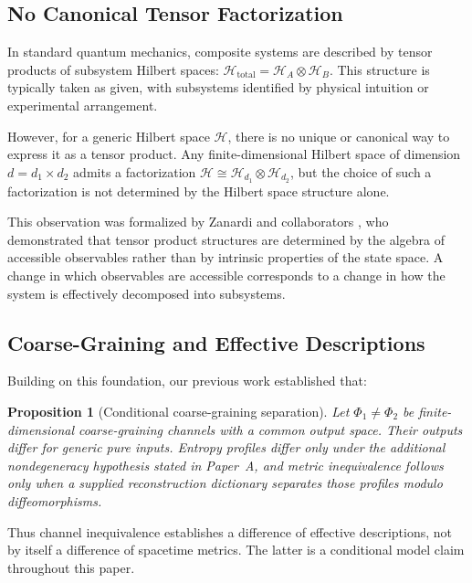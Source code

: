 \documentclass[12pt,a4paper]{article}
\newtheorem{proposition}[theorem]{Proposition}
\begin{document}
\subsection{No Canonical Tensor Factorization}

In standard quantum mechanics, composite systems are described by tensor products of subsystem Hilbert spaces: $\mathcal{H}_{\text{total}} = \mathcal{H}_A \otimes \mathcal{H}_B$. This structure is typically taken as given, with subsystems identified by physical intuition or experimental arrangement.

However, for a generic Hilbert space $\mathcal{H}$, there is no unique or canonical way to express it as a tensor product. Any finite-dimensional Hilbert space of dimension $d = d_1 \times d_2$ admits a factorization $\mathcal{H} \cong \mathcal{H}_{d_1} \otimes \mathcal{H}_{d_2}$, but the choice of such a factorization is not determined by the Hilbert space structure alone.

This observation was formalized by Zanardi and collaborators \cite{Zanardi2001,Zanardi2004}, who demonstrated that tensor product structures are determined by the algebra of accessible observables rather than by intrinsic properties of the state space. A change in which observables are accessible corresponds to a change in how the system is effectively decomposed into subsystems.

\subsection{Coarse-Graining and Effective Descriptions}

Building on this foundation, our previous work \cite{Liu2026PaperA} established that:

\begin{proposition}[Conditional coarse-graining separation]
\label{prop:inequiv}
Let $\Phi_1\ne\Phi_2$ be finite-dimensional coarse-graining channels with a common output space.  Their outputs differ for generic pure inputs.  Entropy profiles differ only under the additional nondegeneracy hypothesis stated in Paper~A, and metric inequivalence follows only when a supplied reconstruction dictionary separates those profiles modulo diffeomorphisms.
\end{proposition}

Thus channel inequivalence establishes a difference of effective descriptions, not by itself a difference of spacetime metrics.  The latter is a conditional model claim throughout this paper.
\end{document}
